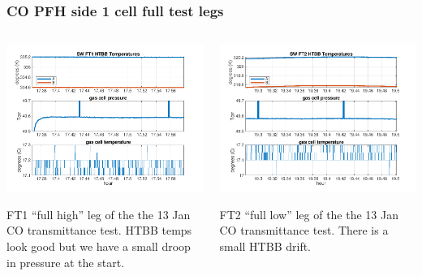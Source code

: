 \documentclass[10pt]{beamer}
\begin{document}
\begin{frame}
\frametitle{CO PFH side 1 cell full test legs}
\begin{columns}[t]
\begin{column}{0.5\textwidth}
  \begin{centering}
  \includegraphics[width=\textwidth]{harvest_01-12/01-13_SW_FT1.png}
  \end{centering}\vspace{3mm}

  FT1 ``full high'' leg of the the 13 Jan CO transmittance test.
  HTBB temps look good but we have a small droop in pressure at the
  start.

\end{column}
\begin{column}{0.5\textwidth}  
  \begin{centering}
  \includegraphics[width=\textwidth]{harvest_01-12/01-13_SW_FT2.png}
  \end{centering}\vspace{3mm}

  FT2 ``full low'' leg of the the 13 Jan CO transmittance test.
  There is a small HTBB drift.

\end{column}
\end{columns}
\end{frame}
\end{document}
